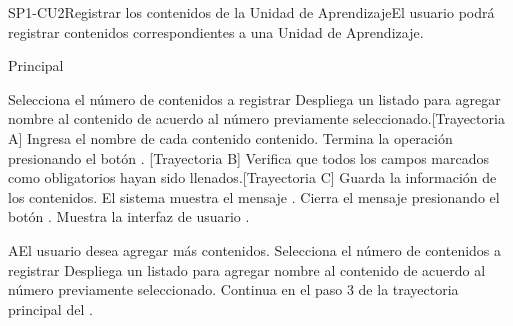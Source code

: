 \begin{UseCase}{SP1-CU2}{Registrar los contenidos de la Unidad de Aprendizaje}{El usuario podrá registrar contenidos correspondientes a una Unidad de Aprendizaje.}
\end{UseCase}

\begin{UCtrayectoria}{Principal}

    \UCpaso[\UCactor] Selecciona el número de contenidos a registrar
    \UCpaso Despliega un listado para agregar nombre al contenido de acuerdo al número previamente seleccionado.[Trayectoria A]
    \UCpaso[\UCactor] Ingresa el nombre de cada contenido contenido.
    \UCpaso[\UCactor] Termina la operación presionando el botón . [Trayectoria B]
    \UCpaso Verifica que todos los campos marcados como obligatorios hayan sido llenados.[Trayectoria C]
    \UCpaso Guarda la información de los contenidos.
    \UCpaso El sistema muestra el mensaje .
    \UCpaso[\UCactor] Cierra el mensaje presionando el botón .
    \UCpaso Muestra la interfaz de usuario .
\end{UCtrayectoria}


\begin{UCtrayectoriaA}{A}{El usuario desea agregar más contenidos.}
    \UCpaso[\UCactor] Selecciona el número de contenidos a registrar
    \UCpaso Despliega un listado para agregar nombre al contenido de acuerdo al número previamente seleccionado.
    \UCpaso Continua en el paso 3 de la trayectoria principal del .

\end{UCtrayectoriaA}

